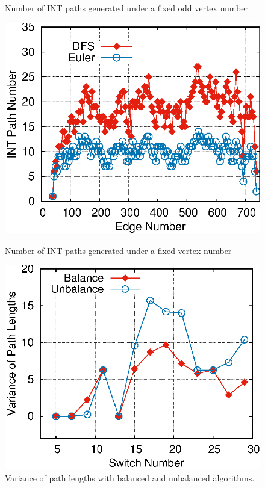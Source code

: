 \begin{figure}[htbp]
					  \vspace{0.0cm}
					  \caption{Number of INT paths generated under a fixed odd vertex number}\label{fig:fix_odd}
					\endminipage\hfill
                    \vspace{-0.0cm} \includegraphics[width=\linewidth]{figure/fix_vertex.eps}
			  \center
			  \vspace{-0.0cm}
			  \caption{Number of INT paths generated under a fixed vertex number}\label{fig:fix_vertex}
			\endminipage\hfill
					\vspace{-0.0cm} \includegraphics[width=\linewidth]{figure/balance.eps}
					  \center
					  \vspace{0.0cm}
					  \caption{Variance of path lengths with balanced and unbalanced algorithms.}\label{fig:balance}
					\endminipage
					 
\vspace{-0.3cm}
\end{figure}


